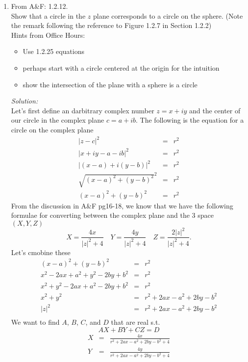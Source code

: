\documentclass[10pt]{amsart}
\theoremstyle{nonumberplain}
\begin{document}
\mline
\begin{enumerate}[label={\bf {\arabic*}:}]
\item From A\&F: 1.2.12. \\
Show that a circle in the $z$ plane corresponds to a circle on the sphere.
(Note the remark following the reference to Figure 1.2.7 in Section 1.2.2)\\
Hints from Office Hours: \\
\begin{itemize}
\item Use 1.2.25 equations
\item perhaps start with a circle centered at the origin for the intuition
\item show the intersection of the plane with a sphere is a circle \\
\end{itemize}
\textit{Solution:} \\
Let's first define an darbitrary complex number $z = x + iy$ and the center of our circle in the complex plane $c = a + ib$.
The following is the equation for a circle on the complex plane
\begin{eqnarray*}
|z - c|^2 &=& r^2 \\
|x + iy - a - ib|^2 &=& r^2 \\
|(x - a) + i(y -b)|^2 &=& r^2 \\
\sqrt{(x - a)^2 + (y - b)^2}^2 &=& r^2 \\
(x - a)^2 + (y - b)^2 &=& r^2
\end{eqnarray*}
From the discussion in A\&F pg16-18, we know that we have the following formulae for converting between the complex plane and the 3 space $(X, Y, Z)$
$$X = \frac{4x}{|z|^2 + 4} \quad Y = \frac{4y}{|z|^2 + 4} \quad Z = \frac{2|z|^2}{|z|^2 + 4}.$$
Let's cmobine these
\begin{eqnarray*}
(x - a)^2 + (y - b)^2 &=& r^2 \\
x^2 -2ax + a^2 + y^2 -2by + b^2 &=& r^2 \\
x^2 + y^2 -2ax + a^2 -2by + b^2 &=& r^2 \\
x^2 + y^2 &=& r^2 +2ax - a^2 +2by - b^2 \\
|z|^2 &=& r^2 +2ax - a^2 +2by - b^2 \\
\end{eqnarray*}
We want to find $A$, $B$, $C$, and $D$ that are real s.t. $$AX + BY + CZ = D$$
\begin{eqnarray*}
X &=& \frac{4x}{r^2 +2ax - a^2 +2by - b^2 + 4} \\
Y &=& \frac{4y}{r^2 +2ax - a^2 +2by - b^2 + 4} \\

\end{eqnarray*}
\end{enumerate}
\end{document}
